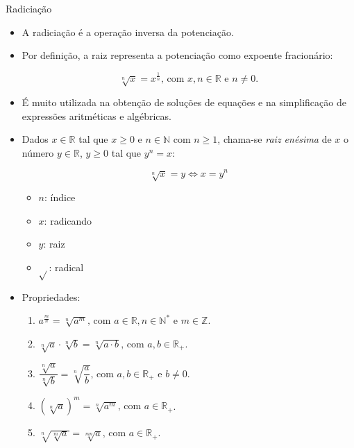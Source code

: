 \documentclass[14pt, aspectratio=169]{beamer}
\newcommand{\R}{\mathbb{R}}
\newcommand{\Z}{\mathbb{Z}}
\newcommand{\N}{\mathbb{N}}
\newcommand{\skipframe}{\vspace{10.0cm}}
\begin{document}
\begin{frame}[allowframebreaks]{Radiciação}
    \begin{itemize}
        \item A radiciação é a operação inversa da potenciação.
        \item Por definição, a raiz representa a potenciação como expoente fracionário:

        \begin{equation*}
            \sqrt[n]{x} = x^{\frac{1}{n}} \text{, com } x, n \in \R \text{ e } n \neq 0.
        \end{equation*}

        \item É muito utilizada na obtenção de soluções de equações e na simplificação de expressões aritméticas e algébricas.

        \skipframe

        \item Dados $x \in \R$ tal que $x \geq 0$ e $n \in \N$ com $n \geq 1$, chama-se \emph{raiz enésima} de $x$ o número $y \in \R$, $y \geq 0$ tal que $y^n = x$:

        \begin{equation*}
            \sqrt[n]{x} = y \Leftrightarrow x = y^n
        \end{equation*}

        \begin{itemize}
            \item $n$: índice
            \item $x$: radicando
            \item $y$: raiz
            \item $\sqrt{}$: radical
        \end{itemize}

        \skipframe

        \item Propriedades:

        \begin{enumerate}[a]
            \item $a^{\frac{m}{n}} = \sqrt[n]{a^m} \text{, com } a \in \R, n \in \N^* \text{ e } m \in \Z$.
            \item $\sqrt[n]{a} \cdot \sqrt[n]{b} = \sqrt[n]{a \cdot b} \text{, com } a, b \in \R_+$.  
            \item $\dfrac{\sqrt[n]{a}}{\sqrt[n]{b}} = \sqrt[n]{\dfrac{a}{b}} \text{, com } a, b \in \R_+ \text{ e } b \neq 0$.
            \item $\left( \sqrt[n]{a} \right)^m = \sqrt[n]{a^m} \text{, com } a \in \R_+$.
            \item $\sqrt[n]{\sqrt[m]{a}} = \sqrt[mn]{a} \text{, com } a \in \R_+$.
        \end{enumerate}
    \end{itemize}
\end{frame}
\end{document}
